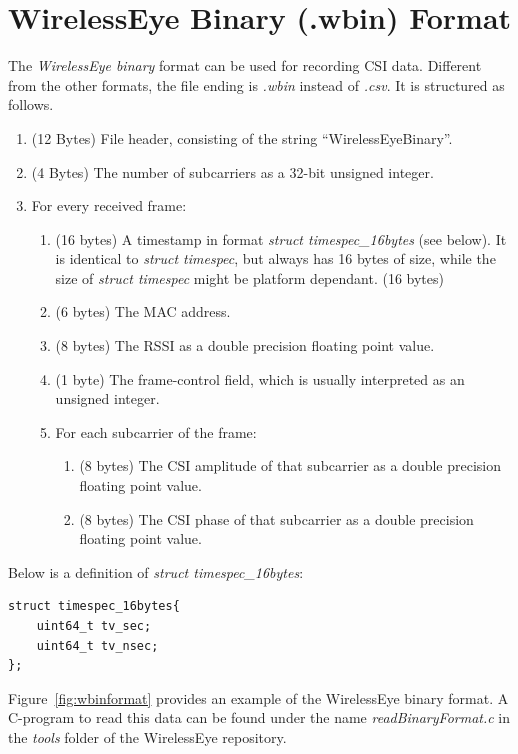 \documentclass{article}
\begin{document}
\section{WirelessEye Binary (.wbin) Format}
The \textit{WirelessEye binary} format can be used for recording CSI data. Different from the other formats, the file ending is \textit{.wbin} instead of \textit{.csv}.
It is structured as follows.
\begin{enumerate}
	\item (12 Bytes) File header, consisting of the string ``WirelessEyeBinary''.
	\item (4 Bytes) The number of subcarriers as a 32-bit unsigned integer.
	\item For every received frame:
	\begin{enumerate}
		\item (16 bytes) A timestamp in format \textit{struct timespec\_16bytes} (see below). It is identical to \textit{struct timespec}, but always has 16 bytes of size, while the size of \textit{struct timespec} might be platform dependant. (16 bytes)
		\item (6 bytes) The MAC address.
		\item (8 bytes) The RSSI as a double precision floating point value.
		\item (1 byte) The frame-control field, which is usually interpreted as an unsigned integer.
		\item For each subcarrier of the frame:
		\begin{enumerate}
			\item (8 bytes) The CSI amplitude of that subcarrier as a double precision floating point value.
			\item (8 bytes) The CSI phase of that subcarrier as a double precision floating point value.
		\end{enumerate}
	\end{enumerate}
\end{enumerate}
Below is a definition of \textit{struct timespec\_16bytes}:
\begin{verbatim}
struct timespec_16bytes{
	uint64_t tv_sec;
	uint64_t tv_nsec;
};
\end{verbatim}
Figure~\ref{fig:wbinformat} provides an example of the WirelessEye binary format.
A C-program to read this data can be found under the name \textit{readBinaryFormat.c} in the \textit{tools} folder of the WirelessEye repository.
\end{document}
